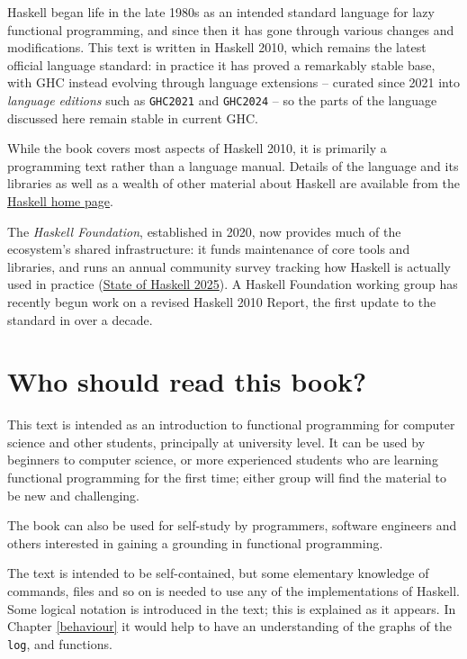 Haskell began life in the late 1980s as an intended standard language for lazy
functional programming, and since then it has gone through various
changes and modifications. This text is written in Haskell 2010, which remains the latest official language standard: in practice it has proved a remarkably stable base, with GHC instead evolving through language extensions -- curated since 2021 into \emph{language editions} such as \texttt{GHC2021} and \texttt{GHC2024} -- so the parts of the language discussed here remain stable in current GHC.

While the book covers most aspects of Haskell 2010, it is primarily a
programming text rather than a language manual. Details of the language
and its libraries as well as a wealth of other material about Haskell are
available from the \href{https://www.haskell.org}{Haskell home page}.

The \emph{Haskell Foundation}, established in 2020, now provides much of
the ecosystem's shared infrastructure: it funds maintenance of core tools
and libraries, and runs an annual community survey tracking how Haskell
is actually used in practice
(\href{https://discourse.haskell.org/t/state-of-haskell-2025-results/13755}{State of Haskell 2025}).
A Haskell Foundation working group has recently begun work on a revised
Haskell 2010 Report, the first update to the standard in over a decade.


\section*{Who should read this book?}

This text is intended as an introduction to functional programming for computer 
science and other students, principally at university level. It can be used by 
beginners to computer science, or more experienced students who are learning 
functional programming for the first time; either group will find the material to be new and challenging.

The book can also be used for self-study by programmers, software engineers and 
others interested in gaining a grounding in functional programming.

The text is intended to be self-contained, but some elementary knowledge of commands, 
files and so on is needed to use any of the implementations of Haskell. Some logical 
notation is introduced in the text; this is explained as it appears. In
Chapter \ref{behaviour}
it would help to have an understanding of the graphs of the \texttt{log}, 
\texttt{} and \texttt{} functions.


